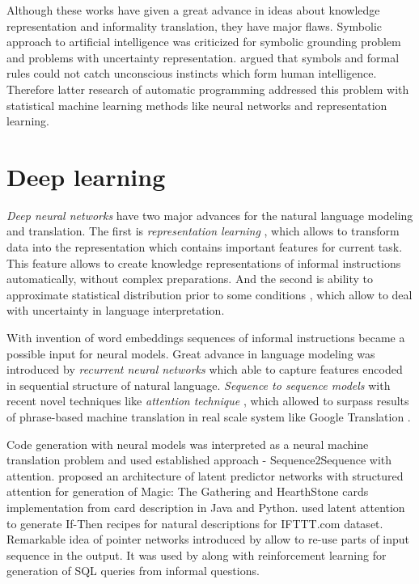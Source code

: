 Although these works have given a great advance in ideas about knowledge representation and informality translation, they have major flaws. Symbolic approach to artificial intelligence was criticized \parencite{mcdermott1987critique, harnad1990symbol} for symbolic grounding problem and problems with uncertainty representation. \cite{dreyfus1994computers} argued that symbols and formal rules could not catch unconscious instincts which form human intelligence. Therefore latter research of automatic programming addressed this problem with statistical machine learning methods like neural networks and representation learning.

\section{Deep learning} 
\emph{Deep neural networks} have two major advances for the natural language modeling and translation. The first is \emph{representation learning} \parencite{Bengio2013}, which allows to transform data into the representation which contains important features for current task. This feature allows to create knowledge representations of informal instructions automatically, without complex preparations. And the second is ability to approximate statistical distribution prior to some conditions \parencite{white1992artificial}, which allow to deal with uncertainty in language interpretation. 

With invention of word embeddings \parencite{bengio2003neural} sequences of informal instructions became a possible input for neural models. Great advance in language modeling was introduced by \emph{recurrent neural networks} \parencite{sundermeyer2012lstm, hochreiter1997long, Jozefowicz2016, Gers2001} which able to capture features encoded in sequential structure of natural language. \emph{Sequence to sequence models} \parencite{NIPS2014_5346} with recent novel techniques like \emph{attention technique} \parencite{Luong2015, Jean2014, Bahdanau2014}, which allowed to surpass results of phrase-based machine translation in real scale system like Google Translation \parencite{Wu2016}. 

Code generation with neural models was interpreted as a neural machine translation problem and used established approach - Sequence2Sequence with attention. \cite{Ling2016} proposed an architecture of latent predictor networks with structured attention for generation of Magic: The Gathering and HearthStone cards implementation from card description in Java and Python. \cite{Chen2016} used latent attention to generate If-Then recipes for natural descriptions for IFTTT.com dataset. Remarkable idea of pointer networks introduced by \cite{NIPS2015_5866} allow to re-use parts of input sequence in the output. It was used by \cite{Zhong2017} along with reinforcement learning for generation of SQL queries from informal questions. \cite{Bhoopchand2016} 

